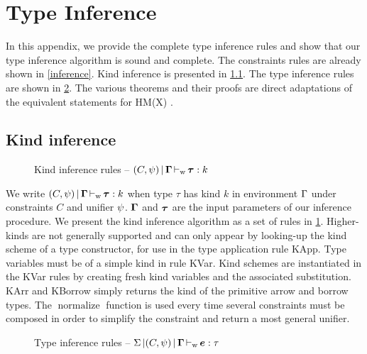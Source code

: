 
\section{Type Inference}
\label{appendix:infer}

In this appendix, we provide the complete type inference rules
and show that our type inference algorithm is sound and complete.
The constraints rules are already shown in \cref{inference}.
Kind inference is presented in \cref{rules:kinding:full}.
The type inference rules are shown in \cref{rules:typing:full}.
The various theorems and their proofs are direct adaptations
of the equivalent statements for HM(X) \citep{sulzmann1997proofs}.


\subsection{Kind inference}
\label{rules:kinding:full}
%
\begin{figure}[tb]
  \centering
  
  \caption{Kind inference rules -- $(C,\mathrm{\psi}) \operatorname{|} {\bm{\Gamma}} \operatorname{\vdash_w} {\bm{\tau}} : k$}
  \label{rules:kinding}
\end{figure}
%
We write $(C,\mathrm{\psi}) \operatorname{|} {\bm{\Gamma}} \operatorname{\vdash_w} {\bm{\tau}} : k$ when type $\tau$ has kind $k$
in environment $\Gamma$ under constraints $C$ and unifier $\mathrm{\psi}$.
$\bm{\Gamma}$ and $\bm{\tau}$ are the input parameters of
our inference procedure.
We present the kind inference algorithm as a set of rules in
\cref{rules:kinding}.
Higher-kinds are not generally supported
and can only appear by looking-up the kind scheme of a type constructor,
for use in the type application rule {\sc KApp}.
Type variables must be of a simple kind in rule {\sc KVar}.
Kind schemes are instantiated in the {\sc KVar} rules by creating
fresh kind variables and the associated substitution.
{\sc KArr} and {\sc KBorrow} simply returns the kind of the primitive
arrow and borrow types.
The $\operatorname{normalize}$ function is used every time several constraints
must be composed in order to simplify the constraint and return a most general
unifier.


\begin{figure*}[!btp]
  
  \caption{Type inference rules --
    $\Sigma \operatorname{|} (C,\psi) \operatorname{|} {\bm{\Gamma}} \operatorname{\vdash_w} {\bm{e}} : \tau$ }
  \label{rules:typing:full}
\end{figure*}






